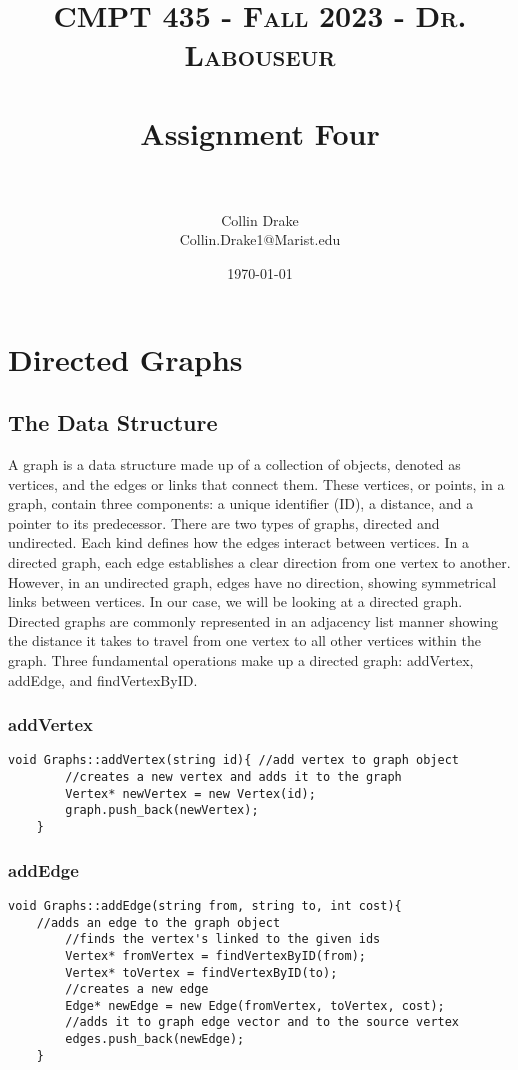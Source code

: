 \documentclass[letterpaper, 10pt,DIV=13]{scrartcl}
\title{	
   \normalfont \normalsize 
   \textsc{CMPT 435 - Fall 2023 - Dr. Labouseur} \\[10pt] %
   \horrule{0.5pt} \\[0.25cm] 	%
   \huge Assignment Four  \\     	    %
   \horrule{0.5pt} \\[0.25cm] 	%
}
\author{Collin Drake \\ \normalsize Collin.Drake1@Marist.edu}
\date{\normalsize\today} 	%
\numberwithin{equation}{section} %
\numberwithin{figure}{section} %
\numberwithin{table}{section} %
\begin{document}
\maketitle %

\section{Directed Graphs}

\subsection{The Data Structure}
A graph is a data structure made up of a collection of objects, denoted as vertices, and the edges or links that connect them. These vertices, or points, in a graph, contain three components: a unique identifier (ID), a distance, and a pointer to its predecessor. There are two types of graphs, directed and undirected. Each kind defines how the edges interact between vertices. In a directed graph, each edge establishes a clear direction from one vertex to another. However, in an undirected graph, edges have no direction, showing symmetrical links between vertices. In our case, we will be looking at a directed graph. Directed graphs are commonly represented in an adjacency list manner showing the distance it takes to travel from one vertex to all other vertices within the graph. Three fundamental operations make up a directed graph: addVertex, addEdge, and findVertexByID.

\subsubsection*{addVertex}
    \lstset{numbers=left, numberstyle=\tiny, stepnumber=1, numbersep=5pt, basicstyle=\footnotesize\ttfamily}
    \begin{lstlisting}[frame=single, ]
    void Graphs::addVertex(string id){ //add vertex to graph object
        //creates a new vertex and adds it to the graph
        Vertex* newVertex = new Vertex(id);
        graph.push_back(newVertex);
    }
\end{lstlisting}

\subsubsection*{addEdge}
    \lstset{numbers=left, numberstyle=\tiny, stepnumber=1, numbersep=5pt, basicstyle=\footnotesize\ttfamily}
    \begin{lstlisting}[frame=single, ]
    void Graphs::addEdge(string from, string to, int cost){ 
    //adds an edge to the graph object
        //finds the vertex's linked to the given ids
        Vertex* fromVertex = findVertexByID(from);
        Vertex* toVertex = findVertexByID(to);
        //creates a new edge
        Edge* newEdge = new Edge(fromVertex, toVertex, cost);
        //adds it to graph edge vector and to the source vertex
        edges.push_back(newEdge);
    }
\end{lstlisting}
\end{document}
